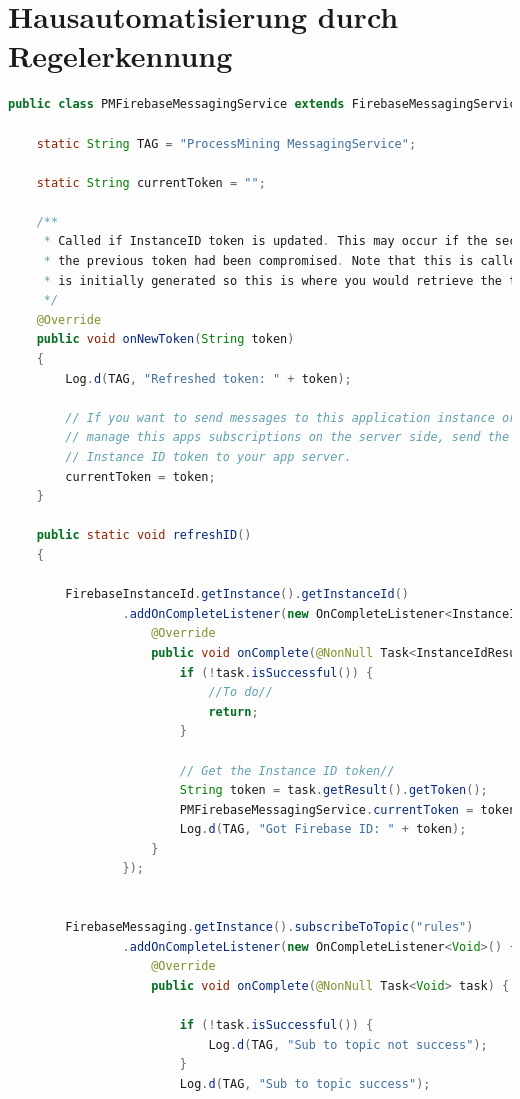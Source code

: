 \section{Hausautomatisierung durch Regelerkennung}
\begin{lstlisting}[language=Java]
public class PMFirebaseMessagingService extends FirebaseMessagingService {

    static String TAG = "ProcessMining MessagingService";

    static String currentToken = "";

    /**
     * Called if InstanceID token is updated. This may occur if the security of
     * the previous token had been compromised. Note that this is called when the InstanceID token
     * is initially generated so this is where you would retrieve the token.
     */
    @Override
    public void onNewToken(String token)
    {
        Log.d(TAG, "Refreshed token: " + token);

        // If you want to send messages to this application instance or
        // manage this apps subscriptions on the server side, send the
        // Instance ID token to your app server.
        currentToken = token;
    }

    public static void refreshID()
    {

        FirebaseInstanceId.getInstance().getInstanceId()
                .addOnCompleteListener(new OnCompleteListener<InstanceIdResult>() {
                    @Override
                    public void onComplete(@NonNull Task<InstanceIdResult> task) {
                        if (!task.isSuccessful()) {
                            //To do//
                            return;
                        }

                        // Get the Instance ID token//
                        String token = task.getResult().getToken();
                        PMFirebaseMessagingService.currentToken = token;
                        Log.d(TAG, "Got Firebase ID: " + token);
                    }
                });


        FirebaseMessaging.getInstance().subscribeToTopic("rules")
                .addOnCompleteListener(new OnCompleteListener<Void>() {
                    @Override
                    public void onComplete(@NonNull Task<Void> task) {

                        if (!task.isSuccessful()) {
                            Log.d(TAG, "Sub to topic not success");
                        }
                        Log.d(TAG, "Sub to topic success");


\end{lstlisting}

